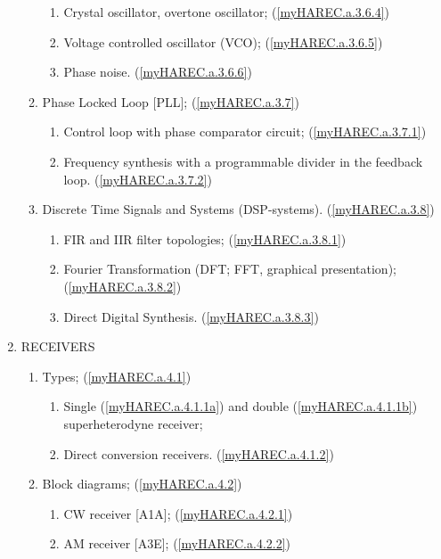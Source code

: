 \begin{enumerate}
\begin{enumerate}[noitemsep]
\begin{enumerate}[noitemsep]
\item Crystal oscillator, overtone oscillator; (\ref{myHAREC.a.3.6.4})\label{HAREC.a.3.6.4}
\item Voltage controlled oscillator (VCO); (\ref{myHAREC.a.3.6.5})\label{HAREC.a.3.6.5}
\item Phase noise. (\ref{myHAREC.a.3.6.6})\label{HAREC.a.3.6.6}
\end{enumerate}
\item Phase Locked Loop [PLL]; (\ref{myHAREC.a.3.7})\label{HAREC.a.3.7}
\begin{enumerate}[noitemsep]
\item Control loop with phase comparator circuit; (\ref{myHAREC.a.3.7.1})\label{HAREC.a.3.7.1}
\item Frequency synthesis with a programmable divider in the feedback loop. (\ref{myHAREC.a.3.7.2})\label{HAREC.a.3.7.2}
\end{enumerate}
\item Discrete Time Signals and Systems (DSP-systems). (\ref{myHAREC.a.3.8})\label{HAREC.a.3.8}
\begin{enumerate}[noitemsep]
\item FIR and IIR filter topologies; (\ref{myHAREC.a.3.8.1})\label{HAREC.a.3.8.1}
\item Fourier Transformation (DFT; FFT, graphical presentation); (\ref{myHAREC.a.3.8.2})\label{HAREC.a.3.8.2}
\item Direct Digital Synthesis. (\ref{myHAREC.a.3.8.3})\label{HAREC.a.3.8.3}
\end{enumerate}
\end{enumerate}
\item RECEIVERS
\begin{enumerate}[noitemsep]
\item Types; (\ref{myHAREC.a.4.1})\label{HAREC.a.4.1}
\begin{enumerate}[noitemsep]
\item Single (\ref{myHAREC.a.4.1.1a})\label{HAREC.a.4.1.1a} and double (\ref{myHAREC.a.4.1.1b})\label{HAREC.a.4.1.1b} superheterodyne receiver;
\item Direct conversion receivers. (\ref{myHAREC.a.4.1.2})\label{HAREC.a.4.1.2}
\end{enumerate}
\item Block diagrams; (\ref{myHAREC.a.4.2})\label{HAREC.a.4.2}
\begin{enumerate}[noitemsep]
\item CW receiver [A1A]; (\ref{myHAREC.a.4.2.1})\label{HAREC.a.4.2.1}
\item AM receiver [A3E]; (\ref{myHAREC.a.4.2.2})\label{HAREC.a.4.2.2}

\end{enumerate}
\end{enumerate}
\end{enumerate}

